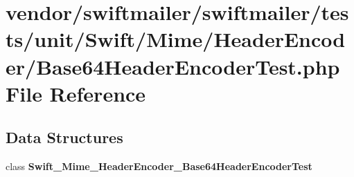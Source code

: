 \section{vendor/swiftmailer/swiftmailer/tests/unit/\+Swift/\+Mime/\+Header\+Encoder/\+Base64\+Header\+Encoder\+Test.php File Reference}
\label{_base64_header_encoder_test_8php}
\subsection*{Data Structures}
\begin{DoxyCompactItemize}
\item 
class {\bf Swift\+\_\+\+Mime\+\_\+\+Header\+Encoder\+\_\+\+Base64\+Header\+Encoder\+Test}
\end{DoxyCompactItemize}
